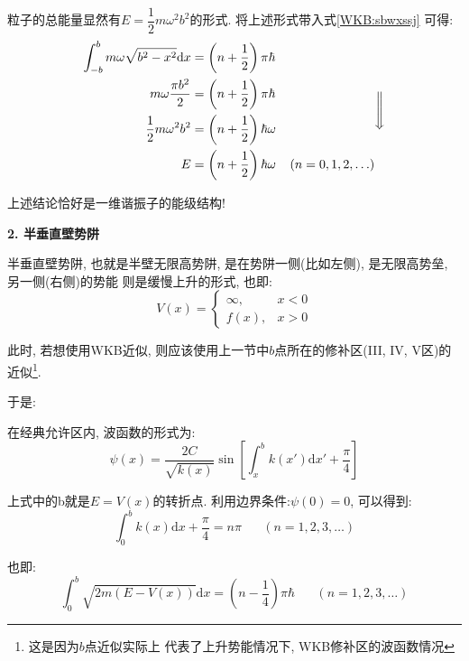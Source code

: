 \documentclass[a4paper, 11pt]{article}
\begin{document}
\begin{spacing}{1.2}
        粒子的总能量显然有$E=\dfrac{1}{2}m\omega^2b^2$的形式. 将上述形式带入式\eqref{WKB:sbwxssj}
        可得:
        \begin{equation}
          \begin{aligned}
            \int_{-b}^bm\omega\sqrt{b^2-x^2}\mathrm{d}x &= \left(n+\dfrac{1}{2}\right)\pi\hbar\\
            m\omega\dfrac{\pi{}b^2}{2} &= \left(n+\dfrac{1}{2}\right)\pi\hbar\\
            \dfrac{1}{2}m\omega^2b^2 &= \left(n+\dfrac{1}{2}\right)\hbar\omega\\
            E &= \left(n+\dfrac{1}{2}\right)\hbar\omega\;\;\;\;(n=0,1,2,\ldots)
          \end{aligned}\Bigg\Downarrow
        \end{equation}

        上述结论恰好是一维谐振子的能级结构!


        \textbf{2. 半垂直壁势阱}

        半垂直壁势阱, 也就是半壁无限高势阱, 是在势阱一侧(比如左侧), 是无限高势垒, 另一侧(右侧)的势能
        则是缓慢上升的形式, 也即:
        \begin{equation}
          V(x) = 
          \left\{\begin{array}{ll}
            \infty, & x<0\\
            f(x), & x>0
          \end{array}\right.
        \end{equation}

        此时, 若想使用WKB近似, 则应该使用上一节中$b$点所在的修补区(III, IV, V区)的近似\footnote{这是因为$b$点近似实际上
        代表了上升势能情况下, WKB修补区的波函数情况}.

        于是:

        在经典允许区内, 波函数的形式为:
        \begin{equation}
          \psi(x) = \dfrac{2C}{\sqrt{k(x)}}\sin\left[\int_x^bk(x')\mathrm{d}x'+\dfrac{\pi}{4}\right]
        \end{equation}

        上式中的b就是$E=V(x)$的转折点. 利用边界条件:$\psi(0) = 0$, 可以得到:
        \begin{equation}
          \int_0^b k(x)\mathrm{d}x + \dfrac{\pi}{4} = n\pi \;\;\;\;\;\; (n=1,2,3,\ldots)
        \end{equation}

        也即:
        \begin{equation}
          \label{WKB:bbwxgeq}
          \int_0^b\sqrt{2m(E-V(x))}\mathrm{d}x = \left(n-\dfrac{1}{4}\right)\pi\hbar \;\;\;\;\;\; (n=1,2,3,\ldots)
        \end{equation}


\end{spacing}
\end{document}
